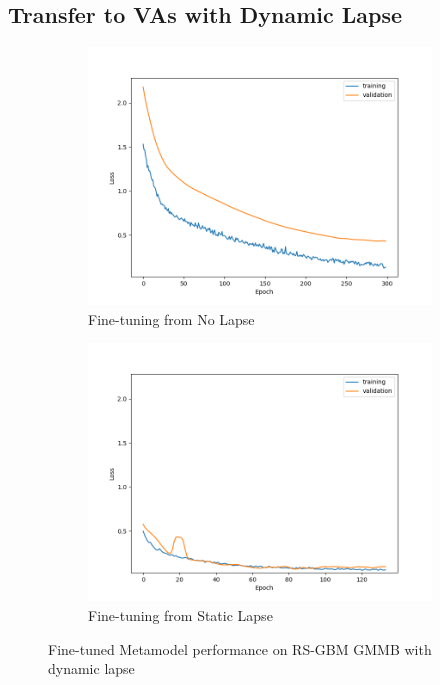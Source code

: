 \subsection{Transfer to VAs with Dynamic Lapse}

\begin{figure}[ht!]
    \centering
    \begin{subfigure}{0.48\textwidth}
        \includegraphics[width=\textwidth]{./project3/figures/figure2a.png}
        \caption{Fine-tuning from No Lapse} 
        \label{subfig3-2:fromNolapse}
    \end{subfigure}\hfill
    \begin{subfigure}{0.48\textwidth}
        \includegraphics[width=\textwidth]{./project3/figures/figure2b.png}
        \caption{Fine-tuning from Static Lapse}
        \label{subfig3-2:fromLapse}
    \end{subfigure}
    \caption{Fine-tuned Metamodel performance on RS-GBM GMMB with dynamic lapse}
    \label{fig3:figure2}
\end{figure}

